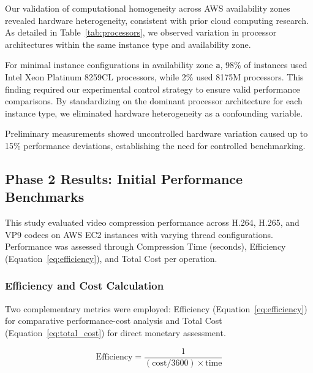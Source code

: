 \documentclass[conference]{IEEEtran}
\begin{document}
	Our validation of computational homogeneity across AWS availability zones revealed hardware heterogeneity, consistent with prior cloud computing research. As detailed in Table~\ref{tab:processors}, we observed variation in processor architectures within the same instance type and availability zone.
	
	For minimal instance configurations in availability zone \texttt{a}, 98\% of instances used Intel Xeon Platinum 8259CL processors, while 2\% used 8175M processors. This finding required our experimental control strategy to ensure valid performance comparisons. By standardizing on the dominant processor architecture for each instance type, we eliminated hardware heterogeneity as a confounding variable.
	
	Preliminary measurements showed uncontrolled hardware variation caused up to 15\% performance deviations, establishing the need for controlled benchmarking.
	
	
	
	
	
	
	
	
	
	
	
	
	\subsection{Phase 2 Results: Initial Performance Benchmarks}
	\label{results-phase2}
	
	This study evaluated video compression performance across H.264, H.265, and VP9 codecs on AWS EC2 instances with varying thread configurations. Performance was assessed through Compression Time (seconds), Efficiency (Equation~\ref{eq:efficiency}), and Total Cost per operation.
	
	\subsubsection{Efficiency and Cost Calculation}
	\label{efficiency-calculation}
	
	Two complementary metrics were employed: Efficiency (Equation~\ref{eq:efficiency}) for comparative performance-cost analysis and Total Cost (Equation~\ref{eq:total_cost}) for direct monetary assessment.
	
	\begin{equation}
		\text{Efficiency} = \frac{1}{(\text{cost}/3600) \times \text{time}}
		\label{eq:efficiency}
	\end{equation}
	
\end{document}
